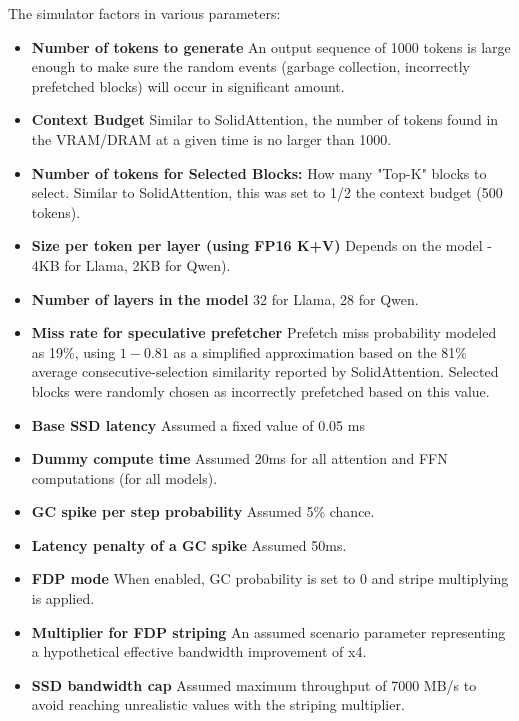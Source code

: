 \documentclass[conference]{IEEEtran}
\begin{document}
            The simulator factors in various parameters:
            \begin{itemize}
                \item {\textbf{Number of tokens to generate} An output sequence of 1000 tokens is large enough to make sure the random events (garbage collection, incorrectly prefetched blocks) will occur in significant amount.}
                \item {\textbf{Context Budget} Similar to SolidAttention, the number of tokens found in the VRAM/DRAM at a given time is no larger than 1000.}
                \item {\textbf{Number of tokens for Selected Blocks:} How many "Top-K" blocks to select. Similar to SolidAttention, this was set to 1/2 the context budget (500 tokens).}
                \item {\textbf{Size per token per layer (using FP16 K+V)} Depends on the model - 4KB for Llama, 2KB for Qwen).}
                \item {\textbf{Number of layers in the model} 32 for Llama, 28 for Qwen.}
                \item {\textbf{Miss rate for speculative prefetcher} Prefetch miss probability modeled as 19\%, using \(1-0.81\) as a simplified approximation based on the 81\% average consecutive-selection similarity reported by SolidAttention. Selected blocks were randomly chosen as incorrectly prefetched based on this value.}
                \item {\textbf{Base SSD latency} Assumed a fixed value of 0.05 ms}
                \item {\textbf{Dummy compute time} Assumed 20ms for all attention and FFN computations (for all models).}
                \item {\textbf{GC spike per step probability} Assumed 5\% chance.}
                \item {\textbf{Latency penalty of a GC spike} Assumed 50ms.}
                \item {\textbf{FDP mode} When enabled, GC probability is set to 0 and stripe multiplying is applied.}
                \item {\textbf{Multiplier for FDP striping} An assumed scenario parameter representing a hypothetical effective bandwidth improvement of x4.}
                \item {\textbf{SSD bandwidth cap} Assumed maximum throughput of 7000 MB/s to avoid reaching unrealistic values with the striping multiplier.}
        \end{itemize}
\end{document}
